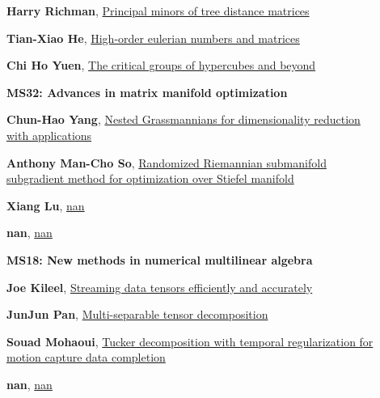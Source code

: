 \documentclass[ILAS2025-program.tex]{subfiles}
\begin{document}
\begin{description}
\begin{description}
        \item[] \hypertarget{up0182}{}\textbf{Harry Richman}, \hyperlink{down0182}{Principal minors of tree distance matrices}
        \item[] \hypertarget{up0183}{}\textbf{Tian-Xiao He}, \hyperlink{down0183}{High-order eulerian numbers and matrices}
        \item[] \hypertarget{up0184}{}\textbf{Chi Ho Yuen}, \hyperlink{down0184}{The critical groups of hypercubes and beyond}
        \end{description}
    \begin{description}
    \item[] {\color{mstitle}\textbf{MS32: Advances in matrix manifold optimization}} 
    \item[] \hypertarget{up0185}{}\textbf{Chun-Hao Yang}, \hyperlink{down0185}{Nested Grassmannians for dimensionality reduction with applications}
        \item[] \hypertarget{up0186}{}\textbf{Anthony Man-Cho So}, \hyperlink{down0186}{Randomized Riemannian submanifold subgradient method for optimization over Stiefel manifold}
        \item[] \hypertarget{up0187}{}\textbf{Xiang Lu}, \hyperlink{down0187}{nan}
        \item[] \hypertarget{up0188}{}\textbf{nan}, \hyperlink{down0188}{nan}
        \end{description}
    \begin{description}
    \item[] {\color{mstitle}\textbf{MS18: New methods in numerical multilinear algebra}} 
    \item[] \hypertarget{up0189}{}\textbf{Joe Kileel}, \hyperlink{down0189}{Streaming data tensors efficiently and accurately
}
        \item[] \hypertarget{up0190}{}\textbf{JunJun Pan}, \hyperlink{down0190}{Multi-separable tensor decomposition}
        \item[] \hypertarget{up0191}{}\textbf{Souad Mohaoui}, \hyperlink{down0191}{Tucker decomposition with temporal regularization for motion capture data completion}
        \item[] \hypertarget{up0192}{}\textbf{nan}, \hyperlink{down0192}{nan}

\end{description}
\end{description}
\end{document}
